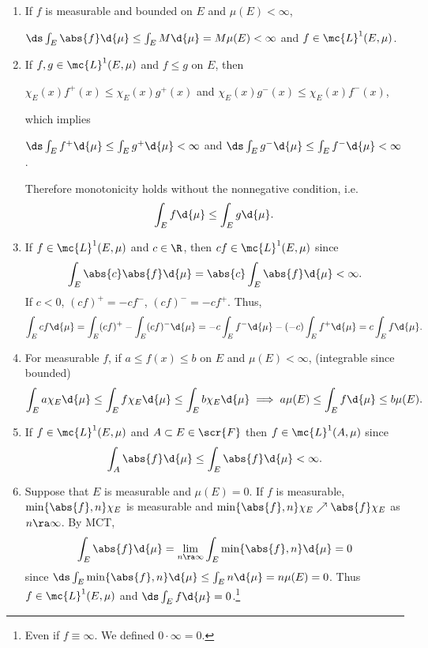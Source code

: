 \rmk
\begin{enumerate}
    \item {} If \(f\) is measurable and bounded on \(E\) and \(\mu(E) < \infty\),
          \begin{center}
              \(\ds \int_E \abs{f} \d{\mu} \leq \int_E M \d{\mu} = M\mu(E) < \infty\) and \(f \in \mc{L}^{1}(E, \mu)\).
          \end{center}
    \item If \(f, g \in \mc{L}^{1}(E, \mu)\) and \(f \leq g\) on \(E\), then
          \begin{center}
              \(\chi_E (x) f^+(x) \leq \chi_E(x) g^+(x)\) and \(\chi_E(x) g^-(x) \leq \chi_E (x) f^-(x)\),
          \end{center}
          which implies
          \begin{center}
              \(\ds \int_E f^+ \d{\mu} \leq \int_E g^+ \d{\mu} < \infty\) and \(\ds \int_E g^- \d{\mu} \leq \int_E f^- \d{\mu} < \infty\).
          \end{center}
          Therefore monotonicity holds without the nonnegative condition, i.e.
          \[
              \int_E f\d{\mu} \leq \int_E g \d{\mu}.
          \]
    \item If \(f \in \mc{L}^{1}(E, \mu)\) and \(c \in \R\), then \(cf \in \mc{L}^{1}(E, \mu)\) since
          \[
              \int_E \abs{c}\abs{f} \d{\mu} = \abs{c} \int_E \abs{f}\d{\mu} < \infty.
          \]
          If \(c < 0\), \((cf)^+ = -cf^-\), \((cf)^- = -cf^+\). Thus,
          \[
              \int_E cf \d{\mu} = \int_E (cf)^+ - \int_E (cf)^- \d{\mu} = -c \int_E f^- \d{\mu} - (-c) \int_E f^+ \d{\mu} = c\int_E f\d{\mu}.
          \]
    \item For measurable \(f\), if \(a\leq f(x) \leq b\) on \(E\) and \(\mu(E) < \infty\), (integrable since bounded)
          \[
              \int_E a \chi_E \d{\mu} \leq \int_E f\chi_E \d{\mu} \leq \int_E b \chi_E \d{\mu} \implies a \mu(E) \leq \int_E f \d{\mu} \leq b \mu(E).
          \]
    \item If \(f \in \mc{L}^{1}(E, \mu)\) and \(A \subset E \in \scr{F}\) then \(f \in \mc{L}^{1}(A, \mu)\) since
          \[
              \int_A \abs{f} \d{\mu} \leq \int_E \abs{f}\d{\mu} < \infty.
          \]
    \item Suppose that \(E\) is measurable and \(\mu(E) = 0\). If \(f\) is measurable, \(\min\{\abs{f}, n\}\chi_E\) is measurable and \(\min\{\abs{f}, n\}\chi_E \nearrow \abs{f}\chi_E\) as \(n \ra \infty\). By MCT,
          \[
              \int_E \abs{f} \d{\mu} = \lim_{n \ra \infty} \int_E \min\{\abs{f}, n\} \d{\mu} = 0
          \]
          since \(\ds \int_E \min\{\abs{f}, n\} \d{\mu} \leq \int_E n \d{\mu} = n \mu(E) = 0\).
          Thus \(f \in \mc{L}^{1}(E, \mu)\) and \(\ds \int_E f \d{\mu} = 0\).\footnote{Even if \(f \equiv \infty\). We defined \(0\cdot\infty = 0\).}
\end{enumerate}


